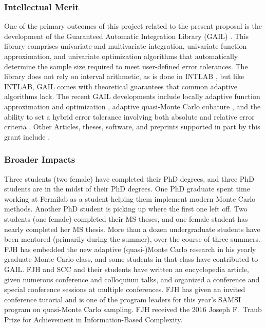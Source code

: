 \documentclass[11pt]{NSFamsart}
\begin{document}
\subsubsection{Intellectual Merit}
One of the primary outcomes of this project related to the present proposal is the development of the Guaranteed Automatic Integration Library (GAIL) \cite{ChoEtal17b}.  This library comprises univariate and multivariate integration, univariate function approximation, and univariate optimization algorithms that automatically determine the sample size required to meet user-defined error tolerances.  The library does not rely on interval arithmetic, as is done in INTLAB \cite{MoKeCl09, Rum99a, Rum10a}, but like INTLAB, GAIL comes with theoretical guarantees that common adaptive algorithms lack. The recent GAIL developments include locally adaptive function approximation and optimization \cite{ChoEtal17a, Din15a}, adaptive quasi-Monte Carlo cubature \cite{HicJim16a, JimHic16a}, and the ability to set a hybrid error tolerance involving both absolute and relative error criteria \cite{HicEtal17a}.  Other Articles, theses,  software, and preprints supported in part by this grant include 
\cite{ala_augmented_2017, 
	GilEtal16a,
	GilJim16b,
	HicEtal18a,	
	Hic17a,
	JohFasHic18a,
	Li16a,
	Liu17a,
	mccourt_stable_2017,
	mishra_hybrid_nodate,
	mishra_stable_nodate, 
	rashidinia_stable_nodate,
	vu_rbf-fd_nodate,
	Zha17a,
	Zho15a,
	ZhoHic15a}.
    
\subsubsection{Broader Impacts}  Three students (two female) have completed their PhD degrees, and three PhD students are in the midst of their PhD degrees.  One PhD graduate spent time working at Fermilab as a student helping them implement modern Monte Carlo methods.  Another PhD student is picking up where the first one left off.  Two students (one female) completed their MS theses, and one female student has nearly completed her MS thesis. More than a dozen undergraduate students have been mentored (primarily during the summer),  over the course of three summers.  FJH has embedded the new adaptive (quasi-)Monte Carlo research in his yearly graduate Monte Carlo class, and some students in that class have contributed to GAIL.  FJH and SCC and their students have written an encyclopedia article, given numerous conference and colloquium talks, and organized a conference and special conference sessions at multiple conferences.  FJH has given an invited conference tutorial and is one of the program leaders for this year's SAMSI program on quasi-Monte Carlo sampling.  FJH received the 2016 Joseph F.\ Traub Prize for Achievement in Information-Based Complexity.
\end{document}

